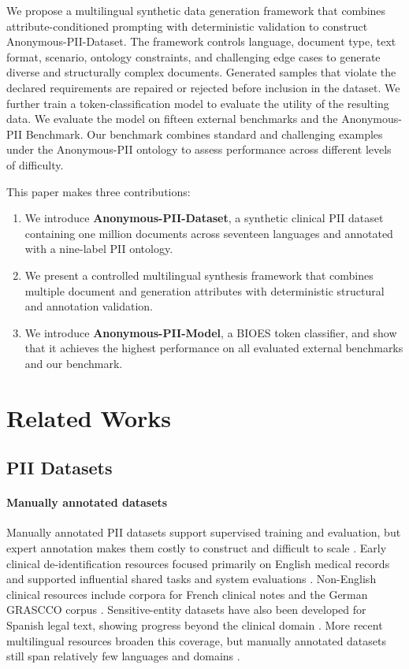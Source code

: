 \documentclass[11pt]{article}
\begin{document}
We propose a multilingual synthetic data generation framework that combines attribute-conditioned prompting with deterministic validation to construct Anonymous-PII-Dataset. The framework controls language, document type, text format, scenario, ontology constraints, and challenging edge cases to generate diverse and structurally complex documents. Generated samples that violate the declared requirements are repaired or rejected before inclusion in the dataset. We further train a token-classification model to evaluate the utility of the resulting data. We evaluate the model on fifteen external benchmarks and the Anonymous-PII Benchmark. Our benchmark combines standard and challenging examples under the Anonymous-PII ontology to assess performance across different levels of difficulty.

This paper makes three contributions:
\begin{enumerate}
\item We introduce \textbf{Anonymous-PII-Dataset}, a synthetic clinical PII dataset containing one million documents across seventeen languages and annotated with a nine-label PII ontology.
\item We present a controlled multilingual synthesis framework that combines multiple document and generation attributes with deterministic structural and annotation validation.
\item We introduce \textbf{Anonymous-PII-Model}, a BIOES token classifier, and show that it achieves the highest performance on all evaluated external benchmarks and our benchmark.
\end{enumerate}

\section{Related Works}

\subsection{PII Datasets}

\paragraph{Manually annotated datasets} Manually annotated PII datasets support supervised training and evaluation, but expert annotation makes them costly to construct and difficult to scale \cite{deleger2014preparing}. Early clinical de-identification resources focused primarily on English medical records and supported influential shared tasks and system evaluations \cite{neamatullah2008automated,uzuner2007evaluating,stubbs2015automated}. Non-English clinical resources include corpora for French clinical notes and the German GRASCCO corpus \cite{grouin2014identification,modersohn2022grascco}. Sensitive-entity datasets have also been developed for Spanish legal text, showing progress beyond the clinical domain \cite{de-gibert-bonet-etal-2022-spanish}. More recent multilingual resources broaden this coverage, but manually annotated datasets still span relatively few languages and domains \cite{baroud2026multigrascco}.
\end{document}
